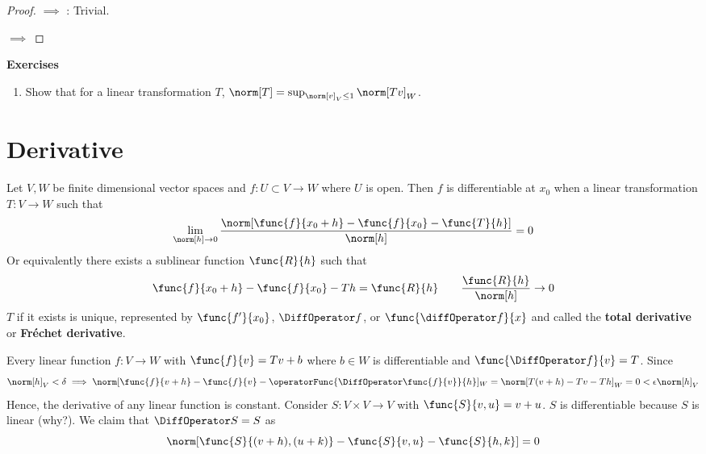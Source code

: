 \begin{proof}
     \(\implies\) : Trivial.

     \(\implies\) 
\end{proof}

{\Large\textbf{Exercises}}
\begin{enumerate}
    \item Show that for a linear transformation \(T\), \(\norm[T] = \sup_{\norm[v]_V \leq 1} \norm[Tv]_W\).
\end{enumerate}
\newpage

\section{Derivative}
Let \(V,W\) be finite dimensional vector spaces and \(f: U \subset V \to W\) where \(U\) is open. Then \(f\) is differentiable at \(x_0\) when a linear transformation \(T : V \to W\) such that
\begin{equation*}
    \lim_{\norm[h] \to 0} \dfrac{\norm[\func{f}{x_0 + h} - \func{f}{x_0} - \func{T}{h}]}{\norm[h]}= 0
\end{equation*}
Or equivalently there exists a sublinear function \(\func{R}{h}\) such that
\begin{equation*}
    \func{f}{x_0 + h} - \func{f}{x_0} - Th = \func{R}{h} \qquad \frac{\func{R}{h}}{\norm[h]} \to 0
\end{equation*}
\(T\) if it exists is unique, represented by \(\func{f'}{x_0}\), \(\DiffOperator f\), or \(\func{\diffOperator f}{x}\) and called the \textbf{total derivative} or \textbf{Fr\'{e}chet derivative}.

\begin{example}
    Every linear function \(f : V \to W\) with \(\func{f}{v} = Tv + b\) where \(b \in W\) is differentiable and \(\func{\DiffOperator f}{v} = T\). Since
    \begin{equation*}
        \norm[h]_V < \delta \implies \norm[\func{f}{v + h} - \func{f}{v} - \operatorFunc{\DiffOperator \func{f}{v}}{h}]_W = \norm[T(v+h) - Tv - Th]_W = 0 < \epsilon \norm[h]_V
    \end{equation*}
    Hence, the derivative of any linear function is constant.
    Consider \(S : V \times V \to V\) with \(\func{S}{v,u} = v + u\). \(S\) is differentiable because \(S\) is linear (why?). We claim that \(\DiffOperator S = S\) as
    \begin{equation*}
        \norm[\func{S}{(v + h),(u + k)} - \func{S}{v,u} - \func{S}{h,k}] = 0
    \end{equation*}
\end{example}

